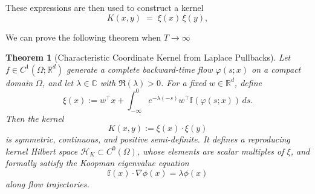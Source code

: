 \documentclass[11pt]{article}
\theoremstyle{plain}
\newtheorem{theorem}{Theorem}[section]
\def\[{\begin{equation}}
\def\]{\end{equation}}
\begin{document}
These expressions are then used to construct a kernel
\[\label{eqn:kernel_path_integral}
K(x,y)\;=\;\xi(x)\,\xi(y),
\]

We can prove the following theorem when $T \rightarrow \infty$
\begin{theorem}[Characteristic Coordinate Kernel from Laplace Pullbacks]
\label{thm:char-kernel}
Let \( f \in C^1(\Omega; \mathbb{R}^d) \) generate a complete backward-time flow \( \varphi(s; x) \) on a compact domain \( \Omega \), and let \( \lambda \in \mathbb{C} \) with \( \Re(\lambda) > 0 \). For a fixed \( w \in \mathbb{R}^d \), define
\[
\xi(x) := w^\top x + \int_{-\infty}^0 e^{-\lambda(-s)} w^\top {\mathbb f}(\varphi(s; x)) \, ds.
\]
Then the kernel
\[
K(x, y) := \xi(x) \cdot \xi(y)
\]
is symmetric, continuous, and positive semi-definite. It defines a reproducing kernel Hilbert space \( \mathcal{H}_K \subset C^0(\Omega) \), whose elements are scalar multiples of \( \xi \), and formally satisfy the Koopman eigenvalue equation
\[
{\mathbb f}(x) \cdot \nabla \phi(x) = \lambda \phi(x)
\]
along flow trajectories.
\end{theorem}
\end{document}
